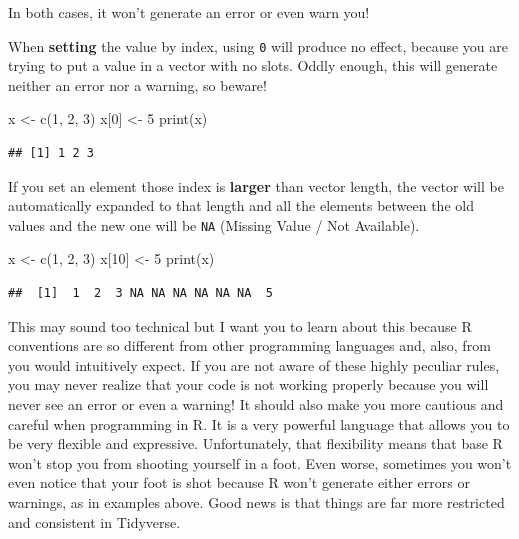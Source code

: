 \documentclass[
]{book}
\newenvironment{Shaded}{\begin{snugshade}}{\end{snugshade}}
\newcommand{\DecValTok}[1]{\textcolor[rgb]{0.00,0.00,0.81}{#1}}
\newcommand{\FunctionTok}[1]{\textcolor[rgb]{0.00,0.00,0.00}{#1}}
\newcommand{\NormalTok}[1]{#1}
\newcommand{\OtherTok}[1]{\textcolor[rgb]{0.56,0.35,0.01}{#1}}
\begin{document}
In both cases, it won't generate an error or even warn you!

When \textbf{setting} the value by index, using \texttt{0} will produce no effect, because you are trying to put a value in a vector with no slots. Oddly enough, this will generate neither an error nor a warning, so beware!

\begin{Shaded}
\begin{Highlighting}[]
\NormalTok{x }\OtherTok{\textless{}{-}} \FunctionTok{c}\NormalTok{(}\DecValTok{1}\NormalTok{, }\DecValTok{2}\NormalTok{, }\DecValTok{3}\NormalTok{)}
\NormalTok{x[}\DecValTok{0}\NormalTok{] }\OtherTok{\textless{}{-}} \DecValTok{5}
\FunctionTok{print}\NormalTok{(x)}
\end{Highlighting}
\end{Shaded}

\begin{verbatim}
## [1] 1 2 3
\end{verbatim}

If you set an element those index is \textbf{larger} than vector length, the vector will be automatically expanded to that length and all the elements between the old values and the new one will be \texttt{NA} (Missing Value / Not Available).

\begin{Shaded}
\begin{Highlighting}[]
\NormalTok{x }\OtherTok{\textless{}{-}} \FunctionTok{c}\NormalTok{(}\DecValTok{1}\NormalTok{, }\DecValTok{2}\NormalTok{, }\DecValTok{3}\NormalTok{)}
\NormalTok{x[}\DecValTok{10}\NormalTok{] }\OtherTok{\textless{}{-}} \DecValTok{5}
\FunctionTok{print}\NormalTok{(x)}
\end{Highlighting}
\end{Shaded}

\begin{verbatim}
##  [1]  1  2  3 NA NA NA NA NA NA  5
\end{verbatim}

This may sound too technical but I want you to learn about this because R conventions are so different from other programming languages and, also, from you would intuitively expect. If you are not aware of these highly peculiar rules, you may never realize that your code is not working properly because you will never see an error or even a warning! It should also make you more cautious and careful when programming in R. It is a very powerful language that allows you to be very flexible and expressive. Unfortunately, that flexibility means that base R won't stop you from shooting yourself in a foot. Even worse, sometimes you won't even notice that your foot is shot because R won't generate either errors or warnings, as in examples above. Good news is that things are far more restricted and consistent in Tidyverse.
\end{document}
